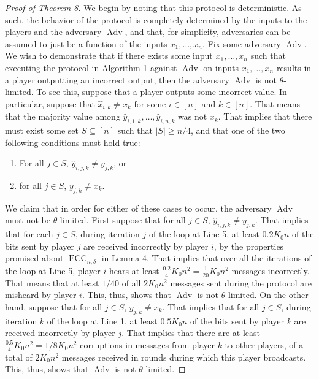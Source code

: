 \begin{proof}[Proof of Theorem 8]
We begin by noting that this protocol is deterministic. As such, the behavior of the protocol is completely determined by the inputs to the players and the adversary $\operatorname{Adv}$, and that, for simplicity, adversaries can be assumed to just be a function of the inputs $x_1,\ldots,x_n$.
Fix some adversary $\operatorname{Adv}$. We wish to demonstrate that if there exists some input $x_1,\ldots,x_n$ such that executing the protocol in Algorithm 1 against $\operatorname{Adv}$ on inputs $x_1,\ldots,x_n$ results in a player outputting an incorrect output, then the adversary $\operatorname{Adv}$ is not $\theta$-limited.
To see this, suppose that a player outputs some incorrect value. In particular, suppose that $\hat x_{i,k}\ne x_k$ for some $i\in[n]$ and $k\in[n]$. That means that the majority value among $\hat y_{i,1,k},\ldots,\hat y_{i,n,k}$ was not $x_k$.
That implies that there must exist some set $S\subseteq[n]$ such that $|S|\ge n/4$, and that one of the two following conditions must hold true:
\begin{enumerate}\item For all $j\in S$, $\hat y_{i,j,k}\ne y_{j,k}$, or\item for all $j\in S$, $y_{j,k}\ne x_k$.\end{enumerate}
We claim that in order for either of these cases to occur, the adversary $\operatorname{Adv}$ must not be $\theta$-limited. First suppose that for all $j\in S$, $\hat y_{i,j,k}\ne y_{j,k}$. That implies that for each $j\in S$, during iteration $j$ of the loop at Line 5, at least $0.2K_0 n$ of the bits sent by player $j$ are received incorrectly by player $i$, by the properties promised about $\operatorname{ECC}_{n,\delta}$ in Lemma 4. That implies that over all the iterations of the loop at Line 5, player $i$ hears at least $\frac{0.2}4 K_0 n^2=\frac1{20}K_0 n^2$ messages incorrectly. That means that at least $1/40$ of all $2K_0 n^2$ messages sent during the protocol are misheard by player $i$. This, thus, shows that $\operatorname{Adv}$ is not $\theta$-limited.
On the other hand, suppose that for all $j\in S$, $y_{j,k}\ne x_k$. That implies that for all $j\in S$, during iteration $k$ of the loop at Line 1, at least $0.5K_0 n$ of the bits sent by player $k$ are received incorrectly by player $j$. That implies that there are at least $\frac{0.5}4 K_0 n^2=1/8K_0 n^2$ corruptions in messages from player $k$ to other players, of a total of $2K_0 n^2$ messages received in rounds during which this player broadcasts. This, thus, shows that $\operatorname{Adv}$ is not $\theta$-limited.
\end{proof}
